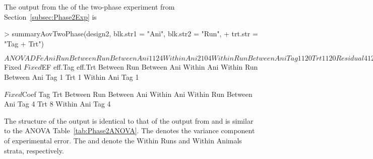 \documentclass[article]{jss}
\begin{document}
The output from the  of the two-phase experiment from Section~\ref{subsec:Phase2Exp} is
\begin{CodeChunk}
\begin{CodeInput}
> summaryAovTwoPhase(design2, blk.str1 = "Ani", blk.str2 = "Run", 
+ trt.str = "Tag + Trt")                                      
\end{CodeInput}
\begin{CodeOutput}
$ANOVA
               DF e Ani Run
Between Run                
   Between Ani 1  1 2   4  
   Within Ani  2  1 0   4  
Within Run                 
   Between Ani             
      Tag      1  1 2   0  
      Trt      1  1 2   0  
      Residual 4  1 2   0  
   Within Ani              
      Tag      2  1 0   0  
      Residual 4  1 0   0  

$Fixed
$Fixed$EF
               eff.Tag eff.Trt
Between Run                   
   Between Ani                
   Within Ani                 
Within Run                    
   Between Ani                
      Tag      1              
      Trt              1      
   Within Ani                 
      Tag      1              

$Fixed$Coef
               Tag Trt
Between Run           
   Between Ani        
   Within Ani         
Within Run            
   Between Ani        
      Tag      4      
      Trt          8  
   Within Ani         
      Tag      4      
\end{CodeOutput}
\end{CodeChunk}
The structure of the output is identical to that of the output from  and is similar to the ANOVA Table~\ref{tab:Phase2ANOVA}. The  denotes the variance component of experimental error. The  and  denote the Within Runs and Within Animals strata, respectively. 
\end{document}
